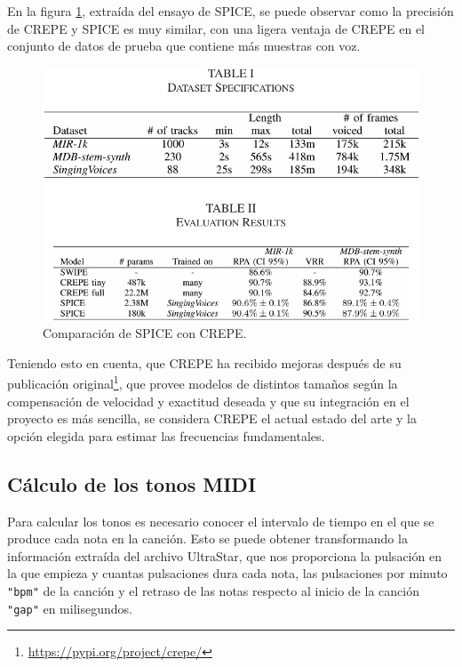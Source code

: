 
En la figura \ref{fig:spicecomparison}, extraída del ensayo de SPICE, se puede observar como la precisión de CREPE y SPICE es muy similar, con una ligera ventaja de CREPE en el conjunto de datos de prueba que contiene más muestras con voz.

\begin{figure}[h!]
	\centering
	\includegraphics[width=0.7\linewidth]{logos/spice_comparison}
	\caption{Comparación de SPICE con CREPE\protect\footnotemark.}
	\label{fig:spicecomparison}
\end{figure}


Teniendo esto en cuenta, que CREPE ha recibido mejoras después de su publicación original\footnote{\url{https://pypi.org/project/crepe/}}, que provee modelos de distintos tamaños según la compensación de velocidad y exactitud deseada y que su integración en el proyecto es más sencilla, se considera CREPE el actual estado del arte y la opción elegida para estimar las frecuencias fundamentales.

\subsection{Cálculo de los tonos MIDI}

Para calcular los tonos es necesario conocer el intervalo de tiempo en el que se produce cada nota en la canción. Esto se puede obtener transformando la información extraída del archivo UltraStar, que nos proporciona la pulsación en la que empieza y cuantas pulsaciones dura cada nota, las pulsaciones por minuto \texttt{"bpm"} de la canción y el retraso de las notas respecto al inicio de la canción \texttt{"gap"} en milisegundos.

